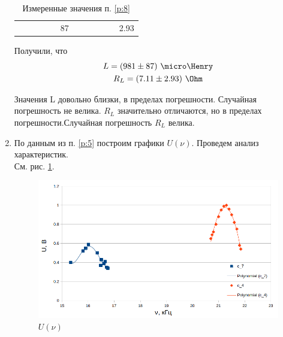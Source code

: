 \documentclass{report}
\begin{document}
\begin{enumerate}
\begin{table}[H]
\begin{tabular}{l|lllllllllll}
			        &                     &                      &               &               & 87      &                 &                                 &       &                    &                       & 2.93          \\
		      \end{tabular}
		      \caption{Измеренные значения п. \ref{p:8}}
		      \label{table:6}
	      \end{table}
	      Получили, что\\
	      \begin{gather}
		      L = (981 \pm 87)\ \micro\Henry \\
		      R_L = (7.11 \pm 2.93)\ \Ohm
	      \end{gather}

	      Значения L довольно близки, в пределах погрешности. Случайная погрешность не велика.
	      $ R_L $ значительно отличаются, но в пределах погрешности.Случайная погрешность $ R_L $ велика.

	\item По данным из п. \ref{p:5} построим графики $ U(\nu) $. Проведем анализ характеристик.\\
	      См. рис. \ref{fig:U}.
	      \begin{figure}[H]
		      \centering
		      \def\svgwidth{\columnwidth}
		      \includegraphics[scale = 0.6]{figures/U3.png}
		      \caption{$U(\nu)$}
		      \label{fig:U}
	      \end{figure}


\end{enumerate}
\end{document}

